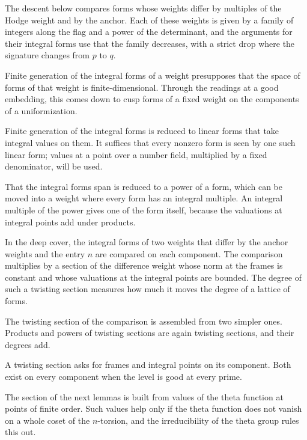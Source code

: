 The descent below compares forms whose weights differ by multiples of the Hodge weight and by the
anchor. Each of these weights is given by a family of integers along the flag and a power of the
determinant, and the arguments for their integral forms use that the family decreases, with a strict
drop where the signature changes from $p$ to $q$.

Finite generation of the integral forms of a weight presupposes that the space of forms of that weight
is finite-dimensional. Through the readings at a good embedding, this comes down to cusp forms of a
fixed weight on the components of a uniformization.

Finite generation of the integral forms is reduced to linear forms that take integral values on them.
It suffices that every nonzero form is seen by one such linear form; values at a point over a number
field, multiplied by a fixed denominator, will be used.

That the integral forms span is reduced to a power of a form, which can be moved into a weight where
every form has an integral multiple. An integral multiple of the power gives one of the form itself,
because the valuations at integral points add under products.

In the deep cover, the integral forms of two weights that differ by the anchor weights and the entry
$n$ are compared on each component. The comparison multiplies by a section of the difference weight whose
norm at the frames is constant and whose valuations at the integral points are bounded. The degree of such
a twisting section measures how much it moves the degree of a lattice of forms.

The twisting section of the comparison is assembled from two simpler ones. Products and powers of
twisting sections are again twisting sections, and their degrees add.

A twisting section asks for frames and integral points on its component. Both exist on every component
when the level is good at every prime.

The section of the next lemmas is built from values of the theta function at points of finite order. Such
values help only if the theta function does not vanish on a whole coset of the $n$-torsion, and the
irreducibility of the theta group rules this out.

